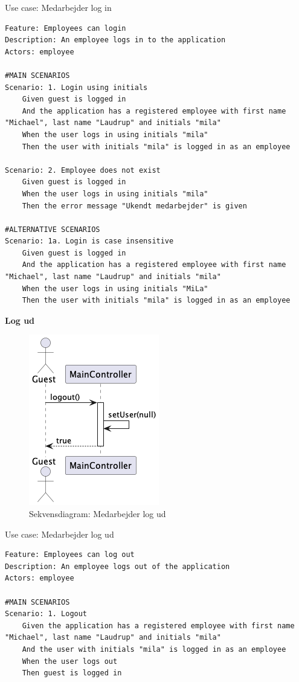 \begin{listing}[H]
    \centering
    \caption{Use case: Medarbejder log in}\label{lst:usecase_login}
    \begin{verbatim}  
Feature: Employees can login
Description: An employee logs in to the application
Actors: employee

#MAIN SCENARIOS
Scenario: 1. Login using initials
    Given guest is logged in
    And the application has a registered employee with first name "Michael", last name "Laudrup" and initials "mila"
    When the user logs in using initials "mila" 
    Then the user with initials "mila" is logged in as an employee

Scenario: 2. Employee does not exist
    Given guest is logged in
    When the user logs in using initials "mila" 
    Then the error message "Ukendt medarbejder" is given

#ALTERNATIVE SCENARIOS
Scenario: 1a. Login is case insensitive
    Given guest is logged in
    And the application has a registered employee with first name "Michael", last name "Laudrup" and initials "mila"
    When the user logs in using initials "MiLa" 
    Then the user with initials "mila" is logged in as an employee
    \end{verbatim}
\end{listing}
\textbf{Log ud}
\begin{figure}[H]
    \centering
    \caption{Sekvensdiagram: Medarbejder log ud}\label{fig:sequence_logout}
    \includegraphics[width = .25\textwidth]{Diagrams/seq_logout.png}
\end{figure}
\begin{listing}[H]
    \centering
    \caption{Use case: Medarbejder log ud}\label{lst:usecase_logout}
    \begin{verbatim}  
Feature: Employees can log out
Description: An employee logs out of the application
Actors: employee

#MAIN SCENARIOS
Scenario: 1. Logout
    Given the application has a registered employee with first name "Michael", last name "Laudrup" and initials "mila"
    And the user with initials "mila" is logged in as an employee
    When the user logs out
    Then guest is logged in
    \end{verbatim}
\end{listing}
